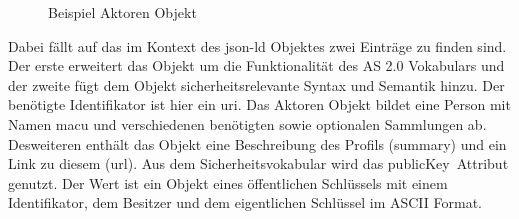 {\begin{figure}[h]
\begin{minipage}{\textwidth}
			\label{fig:actor}
			\caption{Beispiel Aktoren Objekt}
		\end{minipage}
	\end{figure}
	Dabei fällt auf das im Kontext des \gls{json-ld} Objektes zwei Einträge zu finden sind. Der erste erweitert das Objekt um die Funktionalität des AS 2.0 Vokabulars und der zweite fügt dem Objekt sicherheitsrelevante Syntax und Semantik hinzu. Der benötigte Identifikator ist hier ein \gls{uri}. Das Aktoren Objekt bildet eine Person mit Namen macu und verschiedenen benötigten sowie optionalen Sammlungen ab. Desweiteren enthält das Objekt eine Beschreibung des Profils (summary) und ein Link zu diesem (url). Aus dem Sicherheitsvokabular wird das \glqq publicKey\grqq~Attribut genutzt. Der Wert ist ein Objekt eines öffentlichen Schlüssels mit einem Identifikator, dem Besitzer und dem eigentlichen Schlüssel im ASCII Format.
}
